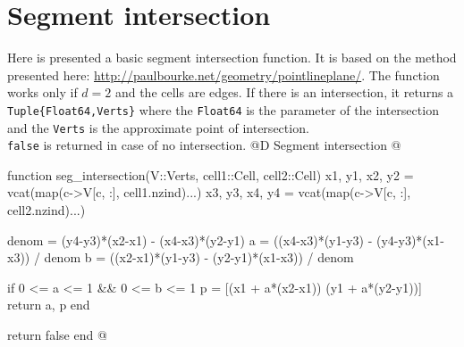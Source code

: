 \documentclass[10pt,oneside]{article}
\begin{document}
\section{Segment intersection}
\label{seg_intersection}
Here is presented a basic segment intersection function.
It is based on the method presented here: \url{http://paulbourke.net/geometry/pointlineplane/}.
The function works only if $d=2$ and the cells are edges.
If there is an intersection, it returns a \texttt{Tuple\{Float64,Verts\}} where 
the \texttt{Float64} is the parameter of the intersection and the \texttt{Verts} 
is the approximate point of intersection. \\
\texttt{false} is returned in case of no intersection.
@D Segment intersection
@{function seg_intersection(V::Verts, cell1::Cell, cell2::Cell)
    x1, y1, x2, y2 = vcat(map(c->V[c, :], cell1.nzind)...)
    x3, y3, x4, y4 = vcat(map(c->V[c, :], cell2.nzind)...)
    
    denom = (y4-y3)*(x2-x1) - (x4-x3)*(y2-y1)
    a = ((x4-x3)*(y1-y3) - (y4-y3)*(x1-x3)) / denom
    b = ((x2-x1)*(y1-y3) - (y2-y1)*(x1-x3)) / denom

    if 0 <= a <= 1 && 0 <= b <= 1
        p = [(x1 + a*(x2-x1))  (y1 + a*(y2-y1))]
        return a, p
    end

    return false
end
@}
\end{document}
